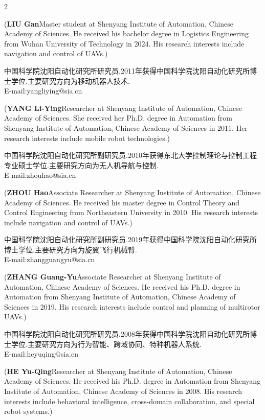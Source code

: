 \documentclass{aas}
\begin{document}
\begin{multicols}{2}
\begin{biographynophoto}
\noindent({\bf LIU Gan}\quad Master student at Shenyang Institute of Automation, Chinese Academy of Sciences. He received his bachelor degree in Logistics Engineering from Wuhan University of Technology in 2024. His research interests include navigation and control of UAVs.)
\end{biographynophoto}

\begin{biographynophoto}
\quad 中国科学院沈阳自动化研究所研究员.2011年获得中国科学院沈阳自动化研究所博士学位.主要研究方向为移动机器人技术.\\E-mail:yangliying@sia.cn

\noindent({\bf YANG Li-Ying}\quad Researcher at Shenyang Institute of Automation, Chinese Academy of Sciences. She received her Ph.D. degree in Automation from Shenyang Institute of Automation, Chinese Academy of Sciences in 2011. Her research interests include mobile robot technologies.)
\end{biographynophoto}

\begin{biographynophoto}
\quad 中国科学院沈阳自动化研究所副研究员.2010年获得东北大学控制理论与控制工程专业硕士学位.主要研究方向为无人机导航与控制.\\E-mail:zhouhao@sia.cn

\noindent({\bf ZHOU Hao}\quad Associate Researcher at Shenyang Institute of Automation, Chinese Academy of Sciences. He received his master degree in Control Theory and Control Engineering from Northeastern University in 2010. His research interests include navigation and control of UAVs.)
\end{biographynophoto}

\begin{biographynophoto}
\quad 中国科学院沈阳自动化研究所副研究员.2019年获得中国科学院沈阳自动化研究所博士学位.主要研究方向为旋翼飞行机械臂.\\E-mail:zhangguangyu@sia.cn

\noindent({\bf ZHANG Guang-Yu}\quad Associate Researcher at Shenyang Institute of Automation, Chinese Academy of Sciences. He received his Ph.D. degree in Automation from Shenyang Institute of Automation, Chinese Academy of Sciences in 2019. His research interests include control and planning of multirotor UAVs.)
\end{biographynophoto}

\begin{biographynophoto}
\quad 中国科学院沈阳自动化研究所研究员.2008年获得中国科学院沈阳自动化研究所博士学位.主要研究方向为行为智能、跨域协同、特种机器人系统.\\E-mail:heyuqing@sia.cn

\noindent({\bf HE Yu-Qing}\quad Researcher at Shenyang Institute of Automation, Chinese Academy of Sciences. He received his Ph.D. degree in Automation from Shenyang Institute of Automation, Chinese Academy of Sciences in 2008. His research interests include behavioral intelligence, cross-domain collaboration, and special robot systems.)
\end{biographynophoto}

\end{multicols}
\end{document}
